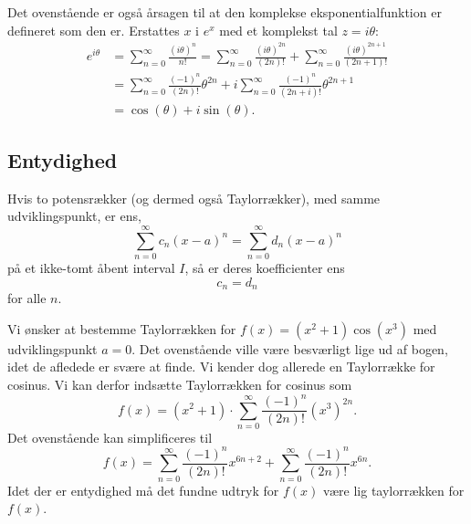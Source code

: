 Det ovenstående er også årsagen til at den komplekse eksponentialfunktion er defineret som den er. Erstattes $x$ i $e^{x}$ med et komplekst tal $z = i\theta$:
\begin{align*}
  e^{i\theta} &= \sum_{n = 0}^{\infty} \frac{(i\theta)^{n}}{n!} = \sum_{n = 0}^{\infty} \frac{(i\theta)^{2n}}{(2n)!} + \sum_{n = 0}^{\infty} \frac{(i\theta)^{2n+1}}{(2n+1)!} \\
      &= \sum_{n = 0}^{\infty} \frac{(-1)^{n}}{(2n)!}\theta^{2n} + i \sum_{n = 0}^{\infty} \frac{(-1)^{n}}{(2n+i)!} \theta^{2n+1} \\
      &= \cos(\theta) + i \sin(\theta)
.\end{align*}


\subsection{Entydighed}

\begin{sæt} 
  Hvis to potensrækker (og dermed også Taylorrækker), med samme udviklingspunkt, er ens, 
  \[ 
  \sum_{n = 0}^{\infty} c_n(x-a)^{n} = \sum_{n = 0}^{\infty} d_n (x-a)^{n}
  \]
  på et ikke-tomt åbent interval $I$, så er deres koefficienter ens
  \[ 
  c_n = d_n
  \]
  for alle $n$. 
\end{sæt}

\begin{eks} 
  Vi ønsker at bestemme Taylorrækken for $f(x) = (x^2 + 1)\cos(x^3)$ med udviklingspunkt $a = 0$.
  \bigbreak
  Det ovenstående ville være besværligt lige ud af bogen, idet de afledede er svære at finde. Vi kender dog allerede en Taylorrække for cosinus. Vi kan derfor indsætte Taylorrækken for cosinus som
  \[ 
    f(x) = (x^2 + 1) \cdot \sum_{n = 0}^{\infty} \frac{(-1)^{n}}{(2n)!} \left( x^3 \right)^{2n}
  .\]
  Det ovenstående kan simplificeres til
  \[ 
    f(x) = \sum_{n = 0}^{\infty} \frac{(-1)^{n}}{(2n)!} x^{6n + 2} + \sum_{n = 0}^{\infty} \frac{(-1)^{n}}{(2n)!} x^{6n}
  .\]
  Idet der er entydighed må det fundne udtryk for $f(x)$ være lig taylorrækken for $f(x)$. 
\end{eks}
